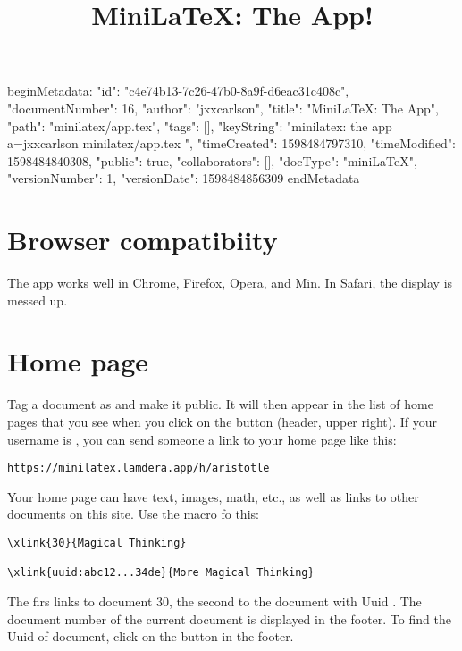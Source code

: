 beginMetadata:
{
    "id": "c4e74b13-7c26-47b0-8a9f-d6eac31c408c",
    "documentNumber": 16,
    "author": "jxxcarlson",
    "title": "MiniLaTeX: The App",
    "path": "minilatex/app.tex",
    "tags": [],
    "keyString": "minilatex: the app a=jxxcarlson minilatex/app.tex ",
    "timeCreated": 1598484797310,
    "timeModified": 1598484840308,
    "public": true,
    "collaborators": [],
    "docType": "miniLaTeX",
    "versionNumber": 1,
    "versionDate": 1598484856309
}
endMetadata
\title{MiniLaTeX: The App!}

\maketitle

\tableofcontents


\section{Browser compatibiity}

The app works well in Chrome, Firefox, Opera, and Min.   In Safari, the display is messed up.

\section{Home page}

Tag a document as   and make it public.  It will then appear in the list of home pages that you see when you click on the button  (header, upper right).  If your username is , you can send someone a link to your home page like this:

\begin{verbatim}
https://minilatex.lamdera.app/h/aristotle
\end{verbatim}

Your home page can have text, images, math, etc., as well as links to other documents on this site.  Use the  macro fo this:

\begin{verbatim}
\xlink{30}{Magical Thinking}

\xlink{uuid:abc12...34de}{More Magical Thinking}
\end{verbatim}

The firs links to document 30, the second to the document with Uuid .  The document number of the current document is displayed in the footer.  To find the Uuid of  document, click on the button  in the footer. 

